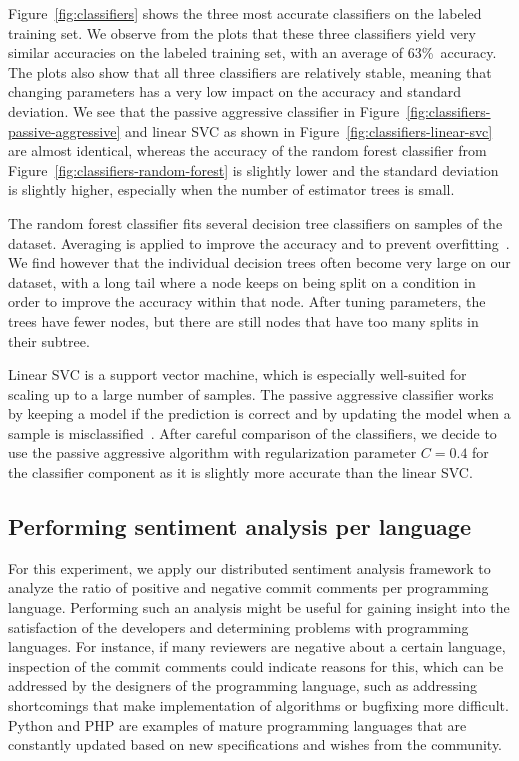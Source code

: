\documentclass{article}
\begin{document}
Figure~\ref{fig:classifiers} shows the three most accurate classifiers on the 
labeled training set. We observe from the plots that these three classifiers 
yield very similar accuracies on the labeled training set, with an average of 
63\%~accuracy. The plots also show that all three classifiers are relatively 
stable, meaning that changing parameters has a very low impact on the accuracy
and standard deviation. We see that the passive aggressive classifier in 
Figure~\ref{fig:classifiers-passive-aggressive} and linear SVC as shown in 
Figure~\ref{fig:classifiers-linear-svc} are almost identical, whereas the 
accuracy of the random forest classifier from 
Figure~\ref{fig:classifiers-random-forest} is slightly lower and the standard 
deviation is slightly higher, especially when the number of estimator trees is 
small.

The random forest classifier fits several decision tree classifiers on
samples of the dataset. Averaging is applied to improve the accuracy and
to prevent overfitting~\cite{breiman2001randomforests}. We find however that 
the individual decision trees often become very large on our dataset, with 
a long tail where a node keeps on being split on a condition in order to 
improve the accuracy within that node. After tuning parameters, the trees have 
fewer nodes, but there are still nodes that have too many splits in their 
subtree.

Linear SVC is a support vector machine, which is especially well-suited for 
scaling up to a large number of samples. The passive aggressive classifier 
works by keeping a model if the prediction is correct and by updating the model 
when a sample is misclassified~\cite{crammer2006passive}. After careful 
comparison of the classifiers, we decide to use the passive aggressive 
algorithm with regularization parameter $C = 0.4$ for the classifier component 
as it is slightly more accurate than the linear SVC.

\subsection{Performing sentiment analysis per language}\label{sec:sentiment-analysis-per-language}
For this experiment, we apply our distributed sentiment analysis framework to
analyze the ratio of positive and negative commit comments per programming
language. Performing such an analysis might be useful for gaining insight into 
the satisfaction of the developers and determining problems with programming 
languages. For instance, if many reviewers are negative about a certain 
language, inspection of the commit comments could indicate reasons for this, 
which can be addressed by the designers of the programming language, such as 
addressing shortcomings that make implementation of algorithms or bugfixing
more difficult. Python and PHP are examples of mature programming languages
that are constantly updated based on new specifications and wishes from the
community.
\end{document}
